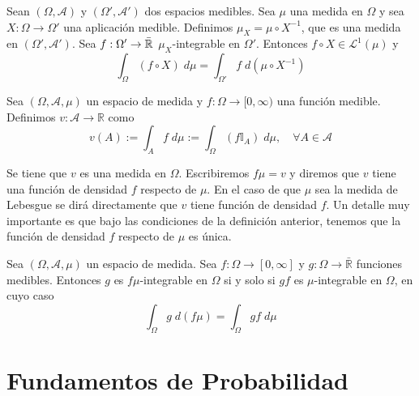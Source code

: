     \begin{proposicion} \label{prop:int1}
    Sean $(\Omega, \mathcal{A})$ y $(\Omega', \mathcal{A}')$ dos espacios medibles. Sea $\mu$ una medida en $\Omega$ y sea $X:\Omega \to \Omega'$ una aplicación medible. Definimos $\mu_X = \mu \circ X^{-1}$, que es una medida en $(\Omega',\mathcal{A}')$. Sea $f:\Omega' \to \Bar{\mathbb{R}}$ $\mu_X$-integrable en $\Omega'$. Entonces $f \circ X \in \mathcal{L}^1(\mu)$ y $$\int_{\Omega} (f \circ X) \; d\mu = \int_{\Omega'} f \; d(\mu \circ X^{-1})$$
    \end{proposicion}
    
    \begin{definicion}
        Sea $(\Omega, \mathcal{A}, \mu)$ un espacio de medida y $f:\Omega \to [0,\infty)$ una función medible. Definimos $v:\mathcal{A} \to \mathbb{R}$ como $$v(A) := \int_A f \; d\mu := \int_\Omega (f\mathbb{I}_A) \; d\mu, \quad \forall A \in \mathcal{A} $$
    \end{definicion}    
    
    Se tiene que $v$ es una medida en $\Omega$. Escribiremos $f\mu = v$ y diremos que $v$ tiene una función de densidad $f$ respecto de $\mu$. En el caso de que $\mu$ sea la medida de Lebesgue se dirá directamente que $v$ tiene función de densidad $f$. Un detalle muy importante es que bajo las condiciones de la definición anterior, tenemos que la función de densidad $f$ respecto de $\mu$ es única. \\ 
    
    
    \begin{proposicion} \label{prop:int2}
     Sea $(\Omega, \mathcal{A}, \mu)$ un espacio de medida. Sea $f:\Omega \to [0,\infty]$ y $g:\Omega \to \bar{\mathbb{R}}$ funciones medibles. Entonces $g$ es $f\mu$-integrable en $\Omega$ si y solo si $gf$ es $\mu$-integrable en $\Omega$, en cuyo caso
     $$\int_{\Omega} g \; d(f\mu) = \int_{\Omega} gf \; d\mu$$
    \end{proposicion}



\section{Fundamentos de Probabilidad}       

